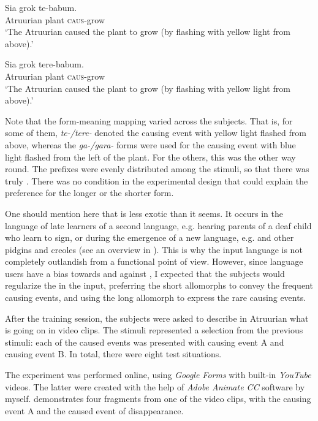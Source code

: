 \documentclass[output=paper]{langsci/langscibook}
\begin{document}
\ea
\ea
\gll  Sia    grok  te-babum.\\
       Atruurian   plant   \textsc{caus}{}-grow\\
\glt ‘The Atruurian caused the plant to grow (by flashing with yellow light from above).'

\ex
\gll  Sia    grok  tere-babum.\\
       Atruurian   plant   \textsc{caus}{}-grow\\
\glt ‘The Atruurian caused the plant to grow (by flashing with yellow light from above).'
\z
\z

Note that the form-meaning mapping varied across the subjects. That is, for some of them, \textit{te-/tere-} denoted the causing event with yellow light flashed from above, whereas the \textit{ga-/gara-} forms were used for the causing event with blue light flashed from the left of the plant. For the others, this was the other way round. The prefixes were evenly distributed among the stimuli, so that there was truly . There was no condition in the experimental design that could explain the preference for the longer or the shorter form.  

One should mention here that  is less exotic than it seems. It occurs in the language of late learners of a second language, e.g. hearing parents of a deaf child who learn to sign, or during the emergence of a new language, e.g.  and other pidgins and creoles (see an overview in \citealt{HudsonKamNewport2009}). This is why the input language is not completely outlandish from a functional point of view. However, since language users have a bias towards  and against , I expected that the subjects would regularize the  in the input, preferring the short allomorphs to convey the frequent causing events, and using the long allomorph to express the rare causing events.

After the training session, the subjects were asked to describe in Atruurian what is going on in video clips. The stimuli represented a selection from the previous stimuli: each of the caused events was presented with causing event A and causing event B. In total, there were eight test situations. 

The experiment was performed online, using \textit{Google Forms} with built-in \textit{YouTube} videos. The latter were created with the help of \textit{Adobe Animate CC} software by myself.  demonstrates four fragments from one of the video clips, with the causing event A and the caused event of disappearance.
\end{document}
